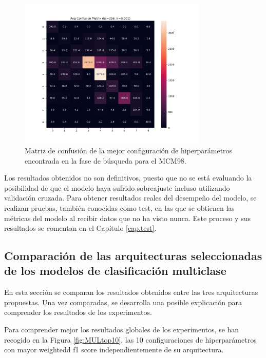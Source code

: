 \begin{figure}[H]
    \centering
    \includegraphics[width=0.8\textwidth]{./img/modelo/matrices_confusion/MC_ENT_MCM98.png}
    \caption{Matriz de confusión de la mejor configuración de hiperparámetros encontrada en la fase de búsqueda para el MCM98.}
    \label{fig:MC_ENT_MCM98}
\end{figure}


Los resultados obtenidos no son definitivos, puesto que no se está evaluando la posibilidad de que el modelo haya sufrido sobreajuste incluso utilizando validación cruzada. Para obtener resultados reales del desempeño del modelo, se realizan pruebas, también conocidas como test, en las que se obtienen las métricas del modelo al recibir datos que no ha visto nunca. Este proceso y sus resultados se comentan en el Capítulo \ref{cap.test}.


\subsection{Comparación de las arquitecturas seleccionadas de los modelos de clasificación multiclase}\label{sec:comp.MUL}
En esta sección se comparan los resultados obtenidos entre las tres arquitecturas propuestas. Una vez comparadas, se desarrolla una posible explicación para comprender los resultados de los experimentos.

Para comprender mejor los resultados globales de los experimentos, se han recogido en la Figura \ref{fig:MULtop10}, las 10 configuraciones de hiperparámetros con mayor weightedd f1 score independientemente de su arquitectura.

